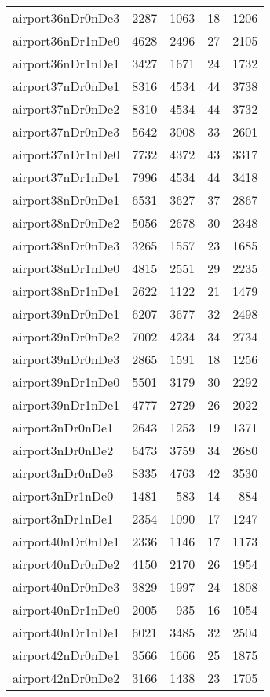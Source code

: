 \begin{longtable}{lrrrr}
airport36nDr0nDe3 & 2287 & 1063 & 18 & 1206 \\
airport36nDr1nDe0 & 4628 & 2496 & 27 & 2105 \\
airport36nDr1nDe1 & 3427 & 1671 & 24 & 1732 \\
airport37nDr0nDe1 & 8316 & 4534 & 44 & 3738 \\
airport37nDr0nDe2 & 8310 & 4534 & 44 & 3732 \\
airport37nDr0nDe3 & 5642 & 3008 & 33 & 2601 \\
airport37nDr1nDe0 & 7732 & 4372 & 43 & 3317 \\
airport37nDr1nDe1 & 7996 & 4534 & 44 & 3418 \\
airport38nDr0nDe1 & 6531 & 3627 & 37 & 2867 \\
airport38nDr0nDe2 & 5056 & 2678 & 30 & 2348 \\
airport38nDr0nDe3 & 3265 & 1557 & 23 & 1685 \\
airport38nDr1nDe0 & 4815 & 2551 & 29 & 2235 \\
airport38nDr1nDe1 & 2622 & 1122 & 21 & 1479 \\
airport39nDr0nDe1 & 6207 & 3677 & 32 & 2498 \\
airport39nDr0nDe2 & 7002 & 4234 & 34 & 2734 \\
airport39nDr0nDe3 & 2865 & 1591 & 18 & 1256 \\
airport39nDr1nDe0 & 5501 & 3179 & 30 & 2292 \\
airport39nDr1nDe1 & 4777 & 2729 & 26 & 2022 \\
airport3nDr0nDe1 & 2643 & 1253 & 19 & 1371 \\
airport3nDr0nDe2 & 6473 & 3759 & 34 & 2680 \\
airport3nDr0nDe3 & 8335 & 4763 & 42 & 3530 \\
airport3nDr1nDe0 & 1481 & 583 & 14 & 884 \\
airport3nDr1nDe1 & 2354 & 1090 & 17 & 1247 \\
airport40nDr0nDe1 & 2336 & 1146 & 17 & 1173 \\
airport40nDr0nDe2 & 4150 & 2170 & 26 & 1954 \\
airport40nDr0nDe3 & 3829 & 1997 & 24 & 1808 \\
airport40nDr1nDe0 & 2005 & 935 & 16 & 1054 \\
airport40nDr1nDe1 & 6021 & 3485 & 32 & 2504 \\
airport42nDr0nDe1 & 3566 & 1666 & 25 & 1875 \\
airport42nDr0nDe2 & 3166 & 1438 & 23 & 1705 \\

\end{longtable}
